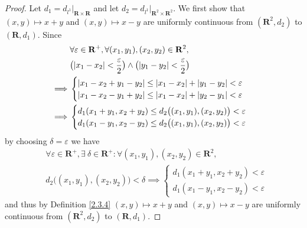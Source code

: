 \begin{proof}
    Let \(d_1 = d_{l^1}|_{\mathbf{R} \times \mathbf{R}}\) and let \(d_2 = d_{l^1}|_{\mathbf{R}^2 \times \mathbf{R}^2}\).
    We first show that \((x, y) \mapsto x + y\) and \((x, y) \mapsto x - y\) are uniformly continuous from \((\mathbf{R}^2, d_2)\) to \((\mathbf{R}, d_1)\).
    Since
    \begin{align*}
                 & \forall \varepsilon \in \mathbf{R}^+, \forall (x_1, y_1), (x_2, y_2) \in \mathbf{R}^2,                      \\
                 & \big(\abs*{x_1 - x_2} < \frac{\varepsilon}{2}\big) \land \big(\abs*{y_1 - y_2} < \frac{\varepsilon}{2}\big) \\
        \implies & \begin{cases}
                       \abs*{x_1 - x_2 + y_1 - y_2} \leq \abs*{x_1 - x_2} + \abs*{y_1 - y_2} < \varepsilon \\
                       \abs*{x_1 - x_2 - y_1 + y_2} \leq \abs*{x_1 - x_2} + \abs*{y_2 - y_1} < \varepsilon \\
                   \end{cases}                         \\
        \implies & \begin{cases}
                       d_1(x_1 + y_1, x_2 + y_2) \leq d_2\big((x_1, y_1), (x_2, y_2)\big) < \varepsilon \\
                       d_1(x_1 - y_1, x_2 - y_2) \leq d_2\big((x_1, y_1), (x_2, y_2)\big) < \varepsilon
                   \end{cases}
    \end{align*}
    by choosing \(\delta = \varepsilon\) we have
    \begin{align*}
         & \forall \varepsilon \in \mathbf{R}^+, \exists\ \delta \in \mathbf{R}^+ : \forall (x_1, y_1), (x_2, y_2) \in \mathbf{R}^2, \\
         & d_2\big((x_1, y_1), (x_2, y_2)\big) < \delta \implies \begin{cases}
                                                                     d_1(x_1 + y_1, x_2 + y_2) < \varepsilon \\
                                                                     d_1(x_1 - y_1, x_2 - y_2) < \varepsilon
                                                                 \end{cases}
    \end{align*}
    and thus by Definition \ref{2.3.4} \((x, y) \mapsto x + y\) and \((x, y) \mapsto x - y\) are uniformly continuous from \((\mathbf{R}^2, d_2)\) to \((\mathbf{R}, d_1)\).


\end{proof}

